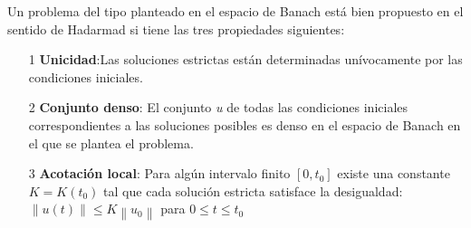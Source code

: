 \documentclass[11pt,letterpaper]{article}
\begin{document}
Un problema del tipo planteado en el espacio de Banach está bien propuesto en el sentido de Hadarmad si tiene las tres propiedades siguientes:
\begin{itemize}
\item[1]{\textbf{Unicidad}:Las soluciones estrictas están determinadas unívocamente por las condiciones iniciales.}
\item[2]{\textbf{Conjunto denso}: El conjunto \textit{u} de todas las condiciones iniciales correspondientes a las soluciones posibles es denso en el espacio de Banach en el que se plantea el problema.}
\item[3]{\textbf{Acotación local}: Para algún intervalo finito $[0,t_0]$ existe una constante $K = K(t_0)$ tal que cada solución estricta satisface la desigualdad: $\left \| u(t) \right \| \leq K \left \| u_0 \right \|$ para $0 \leq t \leq t_0$ }
\end{itemize}
\end{document}
